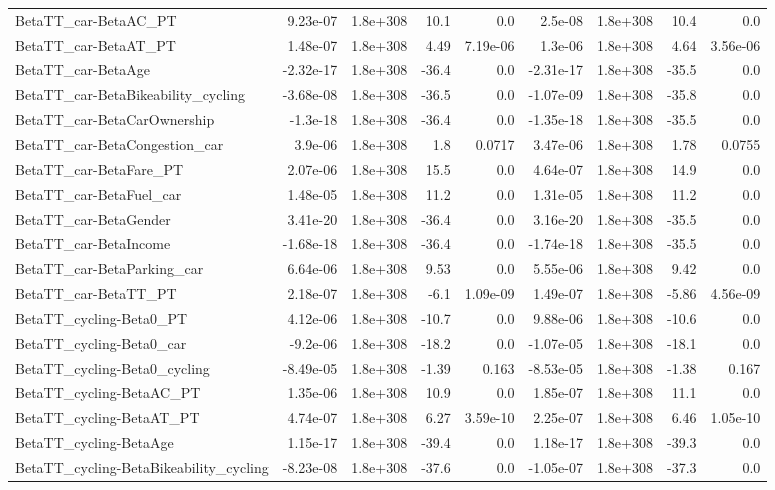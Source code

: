 \begin{tabular}{lrrrrrrrr}
BetaTT_car-BetaAC_PT & 9.23e-07 & 1.8e+308 & 10.1 & 0.0 & 2.5e-08 & 1.8e+308 & 10.4 & 0.0 \\
BetaTT_car-BetaAT_PT & 1.48e-07 & 1.8e+308 & 4.49 & 7.19e-06 & 1.3e-06 & 1.8e+308 & 4.64 & 3.56e-06 \\
BetaTT_car-BetaAge & -2.32e-17 & 1.8e+308 & -36.4 & 0.0 & -2.31e-17 & 1.8e+308 & -35.5 & 0.0 \\
BetaTT_car-BetaBikeability_cycling & -3.68e-08 & 1.8e+308 & -36.5 & 0.0 & -1.07e-09 & 1.8e+308 & -35.8 & 0.0 \\
BetaTT_car-BetaCarOwnership & -1.3e-18 & 1.8e+308 & -36.4 & 0.0 & -1.35e-18 & 1.8e+308 & -35.5 & 0.0 \\
BetaTT_car-BetaCongestion_car & 3.9e-06 & 1.8e+308 & 1.8 & 0.0717 & 3.47e-06 & 1.8e+308 & 1.78 & 0.0755 \\
BetaTT_car-BetaFare_PT & 2.07e-06 & 1.8e+308 & 15.5 & 0.0 & 4.64e-07 & 1.8e+308 & 14.9 & 0.0 \\
BetaTT_car-BetaFuel_car & 1.48e-05 & 1.8e+308 & 11.2 & 0.0 & 1.31e-05 & 1.8e+308 & 11.2 & 0.0 \\
BetaTT_car-BetaGender & 3.41e-20 & 1.8e+308 & -36.4 & 0.0 & 3.16e-20 & 1.8e+308 & -35.5 & 0.0 \\
BetaTT_car-BetaIncome & -1.68e-18 & 1.8e+308 & -36.4 & 0.0 & -1.74e-18 & 1.8e+308 & -35.5 & 0.0 \\
BetaTT_car-BetaParking_car & 6.64e-06 & 1.8e+308 & 9.53 & 0.0 & 5.55e-06 & 1.8e+308 & 9.42 & 0.0 \\
BetaTT_car-BetaTT_PT & 2.18e-07 & 1.8e+308 & -6.1 & 1.09e-09 & 1.49e-07 & 1.8e+308 & -5.86 & 4.56e-09 \\
BetaTT_cycling-Beta0_PT & 4.12e-06 & 1.8e+308 & -10.7 & 0.0 & 9.88e-06 & 1.8e+308 & -10.6 & 0.0 \\
BetaTT_cycling-Beta0_car & -9.2e-06 & 1.8e+308 & -18.2 & 0.0 & -1.07e-05 & 1.8e+308 & -18.1 & 0.0 \\
BetaTT_cycling-Beta0_cycling & -8.49e-05 & 1.8e+308 & -1.39 & 0.163 & -8.53e-05 & 1.8e+308 & -1.38 & 0.167 \\
BetaTT_cycling-BetaAC_PT & 1.35e-06 & 1.8e+308 & 10.9 & 0.0 & 1.85e-07 & 1.8e+308 & 11.1 & 0.0 \\
BetaTT_cycling-BetaAT_PT & 4.74e-07 & 1.8e+308 & 6.27 & 3.59e-10 & 2.25e-07 & 1.8e+308 & 6.46 & 1.05e-10 \\
BetaTT_cycling-BetaAge & 1.15e-17 & 1.8e+308 & -39.4 & 0.0 & 1.18e-17 & 1.8e+308 & -39.3 & 0.0 \\
BetaTT_cycling-BetaBikeability_cycling & -8.23e-08 & 1.8e+308 & -37.6 & 0.0 & -1.05e-07 & 1.8e+308 & -37.3 & 0.0 \\

\end{tabular}
